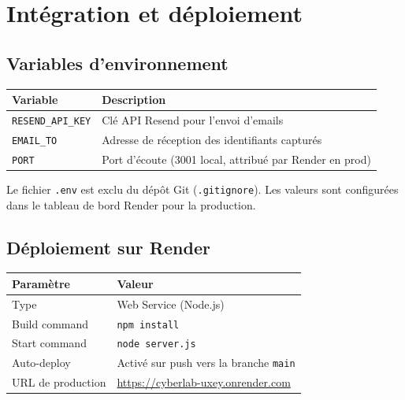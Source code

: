 \documentclass[12pt,a4paper]{report}
\newcommand{\code}[1]{\texttt{#1}}
\begin{document}
\chapter{Intégration et déploiement}

\section{Variables d'environnement}

\begin{center}
\begin{tabular}{L{4.5cm} L{8.5cm}}
  \toprule
  \textbf{Variable} & \textbf{Description} \\
  \midrule
  \code{RESEND\_API\_KEY} & Clé API Resend pour l'envoi d'emails \\
  \code{EMAIL\_TO}        & Adresse de réception des identifiants capturés \\
  \code{PORT}             & Port d'écoute (3001 local, attribué par Render en prod) \\
  \bottomrule
\end{tabular}
\end{center}

Le fichier \code{.env} est exclu du dépôt Git (\code{.gitignore}).
Les valeurs sont configurées dans le tableau de bord Render pour la
production.

\section{Déploiement sur Render}

\begin{center}
\begin{tabular}{L{4cm} L{8.5cm}}
  \toprule
  \textbf{Paramètre} & \textbf{Valeur} \\
  \midrule
  Type               & Web Service (Node.js) \\
  Build command      & \code{npm install} \\
  Start command      & \code{node server.js} \\
  Auto-deploy        & Activé sur push vers la branche \code{main} \\
  URL de production  & \url{https://cyberlab-uxey.onrender.com} \\
  \bottomrule
\end{tabular}
\end{center}
\end{document}

